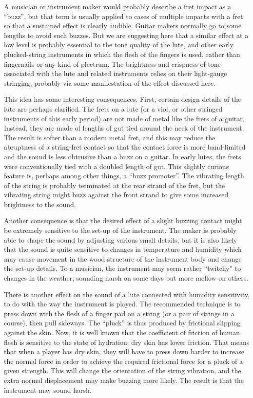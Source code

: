   A musician or instrument maker would probably describe a fret impact as a 
  “buzz”, but that term is usually applied to cases of multiple impacts with a 
  fret so that a sustained effect is clearly audible. Guitar makers normally go 
  to some lengths to avoid such buzzes. But we are suggesting here that a 
  similar effect at a low level is probably essential to the tone quality of 
  the lute, and other early plucked-string instruments in which the flesh of 
  the fingers is used, rather than fingernails or any kind of plectrum. The 
  brightness and crispness of tone associated with the lute and related 
  instruments relies on their light-gauge stringing, probably via some 
  manifestation of the effect discussed here. 

  This idea has some interesting consequences. First, certain design details of 
  the lute are perhaps clarified. The frets on a lute (or a viol, or other 
  stringed instruments of this early period) are not made of metal like the 
  frets of a guitar. Instead, they are made of lengths of gut tied around the 
  neck of the instrument. The result is softer than a modern metal fret, and 
  this may reduce the abruptness of a string-fret contact so that the contact 
  force is more band-limited and the sound is less obtrusive than a buzz on a 
  guitar. In early lutes, the frets were conventionally tied with a doubled 
  length of gut. This slightly curious feature is, perhaps among other things, 
  a “buzz promoter”. The vibrating length of the string is probably terminated 
  at the rear strand of the fret, but the vibrating string might buzz against 
  the front strand to give some increased brightness to the sound. 

  Another consequence is that the desired effect of a slight buzzing contact 
  might be extremely sensitive to the set-up of the instrument. The maker is 
  probably able to shape the sound by adjusting various small details, but it 
  is also likely that the sound is quite sensitive to changes in temperature 
  and humidity which may cause movement in the wood structure of the instrument 
  body and change the set-up details. To a musician, the instrument may seem 
  rather “twitchy” to changes in the weather, sounding harsh on some days but 
  more mellow on others. 

  There is another effect on the sound of a lute connected with humidity 
  sensitivity, to do with the way the instrument is played. The recommended 
  technique is to press down with the flesh of a finger pad on a string (or a 
  pair of strings in a course), then pull sideways. The “pluck” is thus 
  produced by frictional slipping against the skin. Now, it is well known that 
  the coefficient of friction of human flesh is sensitive to the state of 
  hydration: dry skin has lower friction. That means that when a player has dry 
  skin, they will have to press down harder to increase the normal force in 
  order to achieve the required frictional force for a pluck of a given 
  strength. This will change the orientation of the string vibration, and the 
  extra normal displacement may make buzzing more likely. The result is that 
  the instrument may sound harsh. 

